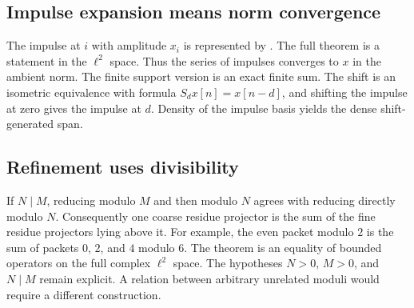 \subsection{Impulse expansion means norm convergence}
The impulse at $i$ with amplitude $x_i$ is represented by . The full theorem is a  statement in the $\ell^2$ space.
Thus the series of impulses converges to $x$ in the ambient norm. The finite support version is an exact finite sum. The shift is an isometric equivalence with formula $S_dx[n]=x[n-d]$, and shifting the impulse at zero gives the impulse at $d$. Density of the impulse basis yields the dense shift-generated span.

\subsection{Refinement uses divisibility}
If $N\mid M$, reducing modulo $M$ and then modulo $N$ agrees with reducing directly modulo $N$. Consequently one coarse residue projector is the sum of the fine residue projectors lying above it.
For example, the even packet modulo $2$ is the sum of packets $0$, $2$, and $4$ modulo $6$. The theorem is an equality of bounded operators on the full complex $\ell^2$ space. The hypotheses $N>0$, $M>0$, and $N\mid M$ remain explicit. A relation between arbitrary unrelated moduli would require a different construction.

